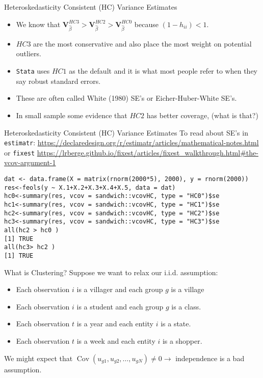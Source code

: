 \documentclass[aspectratio=169]{beamer}
\begin{document}
\begin{frame}{Heteroskedasticity Consistent (HC) Variance Estimates}
\begin{itemize}
\item We know that $\mathbf{V}_{\widehat{\beta}}^{HC3} > \mathbf{V}_{\widehat{\beta}}^{HC2} > \mathbf{V}_{\widehat{\beta}}^{HC0}$ because $(1- h_{ii}) <1$.
\item $HC3$ are the most \alert{conservative} and also place the most weight on potential outliers.
\item \texttt{Stata} uses $HC1$ as the default and it is what most people refer to when they say \alert{robust standard errors}.
\item These are often called White (1980) SE's or Eicher-Huber-White SE's.
\item In small sample some evidence that $HC2$ has better \alert{coverage}, (what is that?)
\end{itemize}
\end{frame}

\begin{frame}[fragile]{Heteroskedasticity Consistent (HC) Variance Estimates}
\footnotesize
To read about SE's in \texttt{estimatr}:
\url{ https://declaredesign.org/r/estimatr/articles/mathematical-notes.html}
or \texttt{fixest}
\url{https://lrberge.github.io/fixest/articles/fixest_walkthrough.html#the-vcov-argument-1}
\begin{verbatim}
dat <- data.frame(X = matrix(rnorm(2000*5), 2000), y = rnorm(2000))
res<-feols(y ~ X.1+X.2+X.3+X.4+X.5, data = dat)
hc0<-summary(res, vcov = sandwich::vcovHC, type = "HC0")$se
hc1<-summary(res, vcov = sandwich::vcovHC, type = "HC1")$se
hc2<-summary(res, vcov = sandwich::vcovHC, type = "HC2")$se
hc3<-summary(res, vcov = sandwich::vcovHC, type = "HC3")$se
all(hc2 > hc0 )
[1] TRUE
all(hc3> hc2 )
[1] TRUE
\end{verbatim}
\end{frame}

\begin{frame}{What is Clustering?}
Suppose we want to relax our i.i.d. assumption:
\begin{itemize}
\item Each observation $i$ is a \alert{villager} and each group $g$ is a \alert{village}
\item Each observation $i$ is a \alert{student} and each group $g$ is a \alert{class}.
\item Each observation $t$ is a \alert{year} and each entity $i$ is a \alert{state}.
\item Each observation $t$ is a \alert{week} and each entity $i$ is a \alert{shopper}.
\end{itemize}
We might expect that $\operatorname { Cov } (u_{g1},u_{g2},\ldots,u_{gN}) \neq 0 \rightarrow$ independence is a bad assumption. 
\end{frame}
\end{document}

